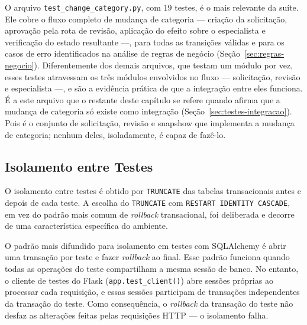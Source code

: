 O arquivo \texttt{test\_change\_category.py}, com 19 testes, é o mais relevante da
suíte. Ele cobre o fluxo completo de mudança de categoria — criação da solicitação,
aprovação pela rota de revisão, aplicação do efeito sobre o especialista e verificação
do estado resultante —, para todas as transições válidas e para os casos de erro
identificados na análise de regras de negócio (Seção~\ref{sec:regras-negocio}).
Diferentemente dos demais arquivos, que testam um módulo por vez, esses testes
atravessam os três módulos envolvidos no fluxo — solicitação, revisão e especialista —,
e são a evidência prática de que a integração entre eles funciona. É a este arquivo que
o restante deste capítulo se refere quando afirma que a mudança de categoria só existe
como integração (Seção~\ref{sec:testes-integracao}). Pois é o conjunto de solicitação, 
revisão e snapshow que implementa a mudança de categoria; nenhum deles, isoladamente, é capaz de fazê-lo.

\subsection{Isolamento entre Testes}
\label{sec:isolamento}

O isolamento entre testes é obtido por \texttt{TRUNCATE} das tabelas
transacionais antes e depois de cada teste. A escolha do \texttt{TRUNCATE}
com \texttt{RESTART IDENTITY CASCADE}, em vez do padrão mais comum de
\textit{rollback} transacional, foi deliberada e decorre de uma
característica específica do ambiente.

O padrão mais difundido para isolamento em testes com SQLAlchemy é abrir uma transação
por teste e fazer \textit{rollback} ao final. Esse padrão funciona quando todas as
operações do teste compartilham a mesma sessão de banco. No entanto, o cliente de testes
do Flask (\texttt{app.test\_client()}) abre sessões próprias ao processar cada
requisição, e essas sessões participam de transações independentes da transação do
teste. Como consequência, o \textit{rollback} da transação do teste não desfaz as
alterações feitas pelas requisições HTTP — o isolamento falha.


